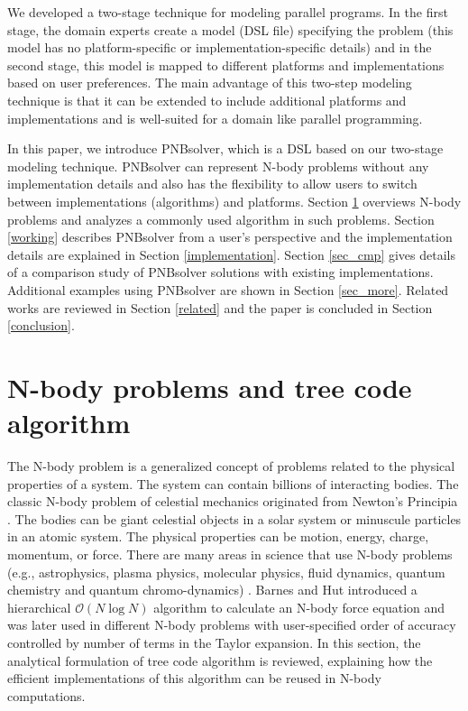 \documentclass[draftclsnofoot]{elsarticle}
\begin{document}
We developed a two-stage technique for modeling parallel programs. In the first stage, the domain experts create a model (DSL file) specifying 
the problem (this model has no platform-specific or implementation-specific details) and in the second stage,  this model is mapped to different platforms and implementations
 based on user preferences. The main advantage of this two-step modeling technique is that it can be extended to include additional platforms and implementations and is well-suited
 for a domain like parallel programming.

In this paper, we introduce PNBsolver, which is a DSL based on our two-stage modeling technique. PNBsolver can represent
N-body problems without any implementation details and also has the flexibility to allow users to switch between implementations (algorithms) and platforms. 
Section \ref{analysis} overviews N-body problems and analyzes a commonly used algorithm in such problems. Section \ref{working} describes PNBsolver from a user's perspective
and the implementation details are explained in Section \ref{implementation}. Section \ref{sec_cmp} gives details of a comparison study of PNBsolver solutions with existing
implementations. Additional examples using PNBsolver are shown in Section \ref{sec_more}. Related works are reviewed in Section \ref{related} and the paper is concluded in 
Section \ref{conclusion}.


\section{N-body problems and tree code algorithm}
\label{analysis}

The N-body problem is a generalized concept of problems related to the physical properties of a system.
 The system can contain billions of interacting bodies.
The classic N-body problem of celestial mechanics originated from Newton's Principia \cite{diacu}.  The bodies can be giant celestial 
objects in a solar system or minuscule particles in an atomic system. The physical properties can be motion, energy, charge, momentum, or force. 
There are many areas in science that use N-body problems (e.g., astrophysics, plasma physics, molecular physics, fluid dynamics, 
quantum chemistry and quantum chromo-dynamics) \cite{watson,jastrow,sasai,carlson}.
Barnes and Hut \cite{barnes} introduced a hierarchical $ \mathcal{O}(N\log{N})$ algorithm to calculate an N-body force equation and was later used in 
different N-body problems \cite{krasny1, krasny2, xu} 
{\color{red}
with user-specified order of accuracy controlled by number of terms in the Taylor expansion. In this section, the analytical formulation of tree code algorithm is 
reviewed, explaining how the efficient implementations of this algorithm can be reused in N-body computations. 
}
\end{document}
